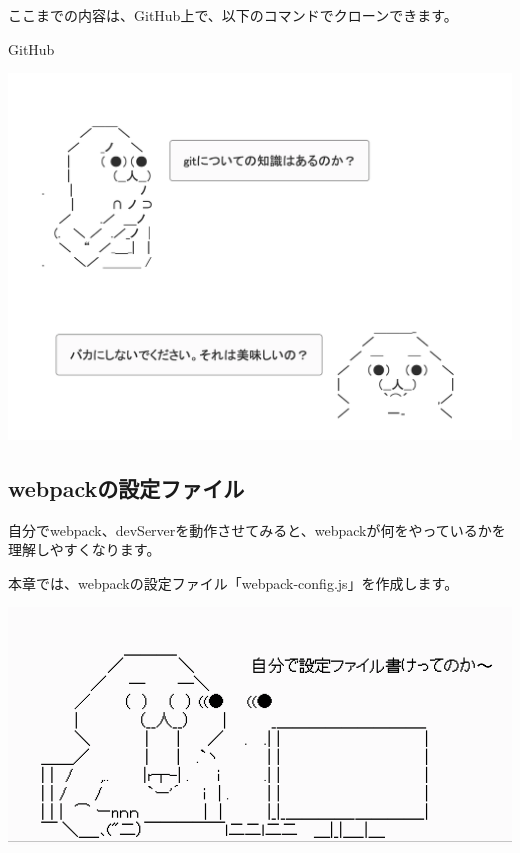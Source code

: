 \begin{starternote}[]{}

ここまでの内容は、GitHub上で、以下のコマンドでクローンできます。

\def\startercodeblockfontsize{}
\begin{starterterminal}[]{GitHub}\end{starterterminal}
\end{starternote}
\begin{reviewimage}[H]%
\includegraphics[width=0.7\maxwidth]{./images/02-create-react-app/git.png}%
\label{image:02-create-react-app:git}
\end{reviewimage}

\clearpage


\subsection{webpackの設定ファイル}
\keeplastskip{
  \label{sec:2-2-4}
  \label{04-webpack-config}
  \par\nobreak
}

自分でwebpack、devServerを動作させてみると、webpackが何をやっているかを理解しやすくなります。

本章では、webpackの設定ファイル「webpack{-}config.js」を作成します。

\begin{reviewimage}[H]%
\includegraphics[width=0.7\maxwidth]{./images/02-create-react-app/generateSettings.png}%
\label{image:02-create-react-app:generateSettings}
\end{reviewimage}

